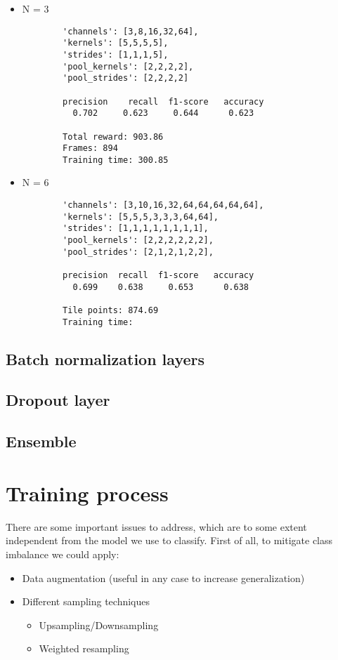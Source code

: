 \documentclass[12pt,a4paper,oneside]{article}
\begin{document}
\begin{itemize}
    \item N = 3
    \begin{verbatim}
        'channels': [3,8,16,32,64],
        'kernels': [5,5,5,5],
        'strides': [1,1,1,5],
        'pool_kernels': [2,2,2,2],
        'pool_strides': [2,2,2,2]

        precision    recall  f1-score   accuracy
          0.702     0.623     0.644      0.623 

        Total reward: 903.86
        Frames: 894
        Training time: 300.85
    \end{verbatim}
    \item N = 6 
    \begin{verbatim}
        'channels': [3,10,16,32,64,64,64,64,64],
        'kernels': [5,5,5,3,3,3,64,64],
        'strides': [1,1,1,1,1,1,1,1],
        'pool_kernels': [2,2,2,2,2,2],
        'pool_strides': [2,1,2,1,2,2],

        precision  recall  f1-score   accuracy
          0.699    0.638     0.653      0.638

        Tile points: 874.69
        Training time:
    \end{verbatim}
\end{itemize}

\subsection{Batch normalization layers}

\subsection{Dropout layer}

\subsection{Ensemble}

\newpage

\section{Training process}

There are some important issues to address, which
are to some extent independent from the model we use to classify. First of all,
to mitigate class imbalance we could apply:
\begin{itemize}
    \item Data augmentation (useful in any case to increase generalization)
    \item Different sampling techniques
    \begin{itemize}
        \item Upsampling/Downsampling
        \item Weighted resampling
    \end{itemize}
\end{itemize}
\end{document}
